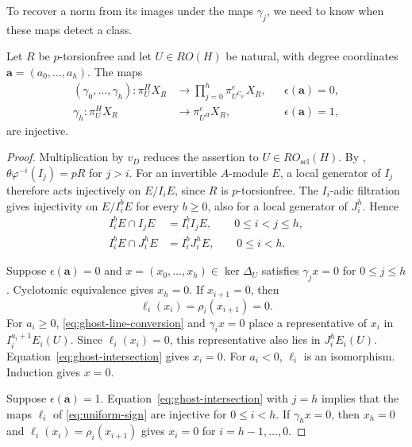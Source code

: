 To recover a norm from its images under the maps $\gamma_j$, we need
to know when these maps detect a class.

\begin{lemma}\label{lem:geometric-ghost-injectivity}
Let $R$ be $p$-torsionfree and let $U\in RO(H)$ be natural, with
degree coordinates $\mathbf a=(a_0,\ldots,a_h)$. The maps
\[
\begin{aligned}
(\gamma_0,\ldots,\gamma_h):\pi_U^H X_R
&\longrightarrow\prod_{j=0}^h\pi_{U^{C_{p^j}}}^eX_R,
&&\epsilon(\mathbf a)=0,\\
\gamma_h:\pi_U^H X_R&\longrightarrow\pi_{U^H}^eX_R,
&&\epsilon(\mathbf a)=1,
\end{aligned}
\]
are injective. 
\end{lemma}
\begin{proof}
Multiplication by $v_D$ reduces the assertion to
$U\in RO_{\mathrm{sel}}(H)$.
By \cite[Lemma~2.2.8]{BhattLurie},
$\theta\varphi^{-i}(I_j)=pR$ for $j>i$.
For an invertible $A$-module $E$, a local generator of $I_j$
therefore acts injectively on $E/I_iE$, since $R$ is $p$-torsionfree.
The $I_i$-adic filtration gives injectivity on $E/I_i^bE$ for every
$b\ge0$, also for a local generator of $J_i^h$. Hence
\begin{equation}\label{eq:ghost-intersection}
\begin{aligned}
I_i^bE\cap I_jE&=I_i^bI_jE,\qquad 0\le i<j\le h,\\
I_i^bE\cap J_i^hE&=I_i^bJ_i^hE,\qquad 0\le i<h.
\end{aligned}
\end{equation}

Suppose $\epsilon(\mathbf a)=0$ and
$x=(x_0,\ldots,x_h)\in\ker\Delta_U$ satisfies $\gamma_jx=0$ for
$0\le j\le h$. Cyclotomic equivalence gives $x_h=0$.
If $x_{i+1}=0$, then
\[
\ell_i(x_i)=\rho_i(x_{i+1})=0.
\]
For $a_i\ge0$, \eqref{eq:ghost-line-conversion} and $\gamma_ix=0$
place a representative of $x_i$ in $I_i^{a_i+1}E_i(U)$.
Since $\ell_i(x_i)=0$, this representative also lies in $J_i^hE_i(U)$.
Equation~\eqref{eq:ghost-intersection} gives $x_i=0$.
For $a_i<0$, $\ell_i$ is an isomorphism.
Induction gives $x=0$.

Suppose $\epsilon(\mathbf a)=1$.
Equation~\eqref{eq:ghost-intersection} with $j=h$ implies that
the maps $\ell_i$ of \eqref{eq:uniform-sign} are injective for $0\le i<h$.
If $\gamma_hx=0$, then $x_h=0$ and
$\ell_i(x_i)=\rho_i(x_{i+1})$ gives $x_i=0$ for $i=h-1,\ldots,0$.

\end{proof}

